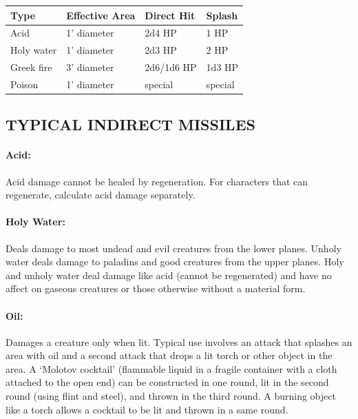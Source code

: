 \begin{multicols}{2}
\begin{minipage}{\columnwidth}
\end{minipage}

\noindent
\begin{minipage}{\columnwidth}

\label{covermods}
\noindent
\begin{tabular}{|m{}|m{}|m{}|m{}|}
\hline
Type	& Effective Area	& Direct Hit	& Splash \\
\hline\hline
\rowcolor[gray]{.9}Acid	& 1' diameter	& 2d4 HP	& 1 HP \\
Holy water	& 1' diameter	& 2d3 HP	& 2 HP \\
\rowcolor[gray]{.9}Greek fire	& 3' diameter	& 2d6/1d6 HP	& 1d3 HP \\
Poison	& 1' diameter	& special	& special \\
\hline
\end{tabular}

\end{minipage}

\subsection{TYPICAL INDIRECT MISSILES}

\paragraph{Acid:} Acid damage cannot be healed by regeneration.  For characters that can regenerate, calculate acid damage separately.

\paragraph{Holy Water:} Deals damage to most undead and evil creatures from the lower planes.  Unholy water deals damage to paladins and good creatures from the upper planes.  Holy and unholy water deal damage like acid (cannot be regenerated) and have no affect on gaseous creatures or those otherwise without a material form.

\paragraph{Oil:} Damages a creature only when lit.  Typical use involves an attack that splashes an area with oil and a second attack that drops a lit torch or other object in the area.  A `Molotov cocktail' (flammable liquid in a fragile container with a cloth attached to the open end) can be constructed in one round, lit in the second round (using flint and steel), and thrown in the third round.  A burning object like a torch allows a cocktail to be lit and thrown in a same round.


\end{multicols}
